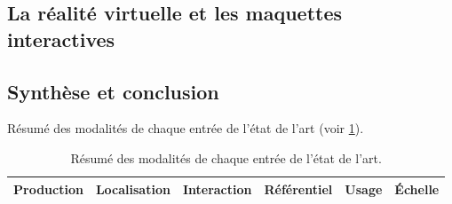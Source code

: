


\todo{}

\subsection{La réalité virtuelle et les maquettes interactives}


\todo{}

\subsection{Synthèse et conclusion}


Résumé des modalités de chaque entrée de l'état de l'art (voir \ref{tab:ea_resume}).

\begin{table}
\begin{center}
\scriptsize
\begin{tabular}{ | l | l | l | l | l | l | }
    Production & Localisation & Interaction & Référentiel & Usage & Échelle \tabularnewline
    \hline
\end{tabular}
\end{center}
\caption{Résumé des modalités de chaque entrée de l'état de l'art.}
\label{tab:ea_resume}
\end{table}

\todo{}